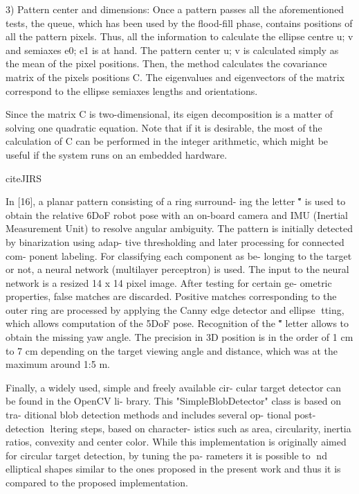\documentclass[a4paper]{report}
\begin{document}
3) Pattern center and dimensions: Once a pattern passes all
the aforementioned tests, the queue, which has been used by
the flood-fill phase, contains positions of all the pattern pixels.
Thus, all the information to calculate the ellipse centre u; v and
semiaxes e0; e1 is at hand. The pattern center u; v is calculated
simply as the mean of the pixel positions. Then, the method
calculates the covariance matrix of the pixels positions C. The
eigenvalues and eigenvectors of the matrix correspond to the
ellipse semiaxes lengths and orientations. 

Since the matrix C is two-dimensional, its eigen decomposition
is a matter of solving one quadratic equation. Note
that if it is desirable, the most of the calculation of C can be
performed in the integer arithmetic, which might be useful if
the system runs on an embedded hardware.


cite{JIRS}

In [16], a planar pattern consisting of a ring surround-
ing the letter \H" is used to obtain the relative 6DoF
robot pose with an on-board camera and IMU (Inertial
Measurement Unit) to resolve angular ambiguity. The
pattern is initially detected by binarization using adap-
tive thresholding and later processing for connected com-
ponent labeling. For classifying each component as be-
longing to the target or not, a neural network (multilayer
perceptron) is used. The input to the neural network is a
resized 14 x 14 pixel image. After testing for certain ge-
ometric properties, false matches are discarded. Positive
matches corresponding to the outer ring are processed
by applying the Canny edge detector and ellipse tting,
which allows computation of the 5DoF pose. Recognition
of the \H" letter allows to obtain the missing yaw angle.
The precision in 3D position is in the order of 1 cm to
7 cm depending on the target viewing angle and distance,
which was at the maximum around 1:5 m.

Finally, a widely used, simple and freely available cir-
cular target detector can be found in the OpenCV li-
brary. This "SimpleBlobDetector" class is based on tra-
ditional blob detection methods and includes several op-
tional post-detection ltering steps, based on character-
istics such as area, circularity, inertia ratios, convexity
and center color. While this implementation is originally
aimed for circular target detection, by tuning the pa-
rameters it is possible to nd elliptical shapes similar
to the ones proposed in the present work and thus it is
compared to the proposed implementation.
\end{document}

